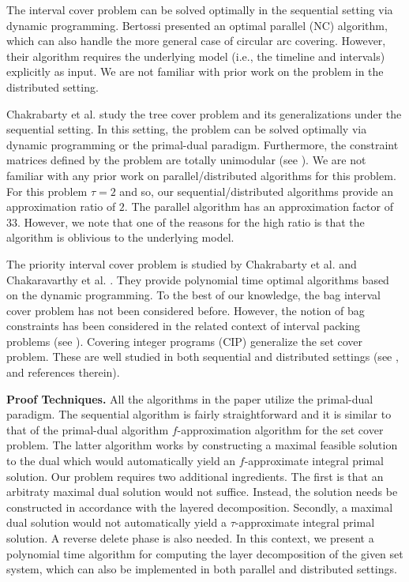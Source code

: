 \documentclass[11pt]{article}
\begin{document}
The interval cover problem can be solved optimally in the sequential setting via dynamic programming.
Bertossi \cite{Bertossi} presented an optimal parallel (NC) algorithm,
which can also handle the more general case of circular arc covering.
However, their algorithm requires the underlying model (i.e., the timeline and intervals) explicitly as input.
We are not familiar with prior work on the problem in the distributed setting.

Chakrabarty et al. \cite{CGK} study the tree cover problem and its generalizations under the sequential setting.
In this setting, the problem can be solved optimally via dynamic programming or the primal-dual paradigm.
Furthermore, the constraint matrices defined by the problem are totally unimodular (see \cite{CGK}).
We are not familiar with any prior work on parallel/distributed algorithms for this problem.
For this problem $\tau=2$ and so, our sequential/distributed algorithms provide an approximation ratio of $2$.
The parallel algorithm has an approximation factor of $33$. However, we note that one of the reasons for the high
ratio is that the algorithm is oblivious to the underlying model.

The priority interval cover problem is studied by Chakrabarty et al. \cite{CGK} and Chakaravarthy et al. \cite{our-esa}. 
They provide polynomial time optimal algorithms based on the dynamic programming.
To the best of our knowledge, the bag interval cover problem has not been considered before.
However, the notion of bag constraints has been considered in the related context
of interval packing problems (see \cite{Bar-Noy-Jacm, Berman-Dasgupta}).
Covering integer programs (CIP) generalize the set cover problem.
These are well studied in both sequential and distributed settings (see \cite{Kouf-Young,CGK}, and references therein).

{\bf Proof Techniques. }
All the algorithms in the paper utilize the primal-dual paradigm. 
The sequential algorithm is fairly straightforward and it is similar to that of
the primal-dual algorithm $f$-approximation algorithm for the set cover problem.
The latter algorithm works by constructing a maximal feasible solution to the dual
which would automatically yield an $f$-approximate integral primal solution.
Our problem requires two additional ingredients. The first is that an arbitraty maximal dual
solution would not suffice. Instead, the solution needs be constructed in accordance
with the layered decomposition. Secondly, a maximal dual solution would not automatically
yield a $\tau$-approximate integral primal solution. A reverse delete phase is also needed.
In this context, we present a polynomial time algorithm for computing the layer decomposition of the given set system,
which can also be implemented in both parallel and distributed settings.
\end{document}

